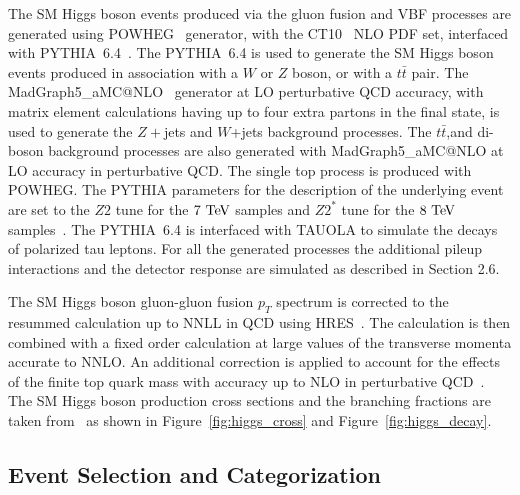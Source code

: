 The SM Higgs boson events produced via the gluon fusion and VBF processes are generated using POWHEG~\cite{POWHEG-V, POWHEG1, POWHEG2, POWHEG3} generator, with the CT10~\cite{Lai:2010vv} NLO PDF set, interfaced with PYTHIA~6.4~\cite{Sjostrand:2006za}. The PYTHIA~6.4 is used to generate the SM Higgs boson events produced in association with a $W$ or $Z$ boson, or with a $t\bar{t}$ pair. The MadGraph5\_aMC@NLO~\cite{Alwall:2007st} generator at LO perturbative QCD accuracy, with matrix element calculations having up to four extra partons in the final state, is used to generate the $Z+$jets and $W$+jets background processes. The $t\bar{t}$,and di-boson background processes are also generated with MadGraph5\_aMC@NLO at LO accuracy in perturbative QCD. The single top process is produced with POWHEG. The PYTHIA parameters for the description of the underlying event are set to the $Z2$ tune for the $7~\mathrm{Te\kern -0.1em V}$ samples and $Z2^{*}$ tune for the $8~\mathrm{Te\kern -0.1em V}$ samples~\cite{CMS-PAS-FSQ-12-020}. The PYTHIA~6.4 is interfaced with TAUOLA to simulate the decays of polarized tau leptons. For all the generated processes the additional pileup interactions and the detector response are simulated as described in Section 2.6. 

The SM Higgs boson gluon-gluon fusion $p_{T}$ spectrum is corrected to the resummed calculation up to NNLL in QCD using HRES~\cite{deFlorian:2012mx}. The calculation is then combined with a fixed order calculation at large values of the transverse momenta accurate to NNLO. An additional correction is applied to account for the effects of the finite top quark mass with accuracy up to NLO in perturbative QCD~\cite{Grazzini:2013mca}. The SM Higgs boson production cross sections and the branching fractions are taken from~\cite{Dittmaier:2011ti,Dittmaier:2012vm,Heinemeyer:2013tqa} as shown in Figure~\ref{fig:higgs_cross} and Figure~\ref{fig:higgs_decay}.

\subsection{Event Selection and Categorization}

